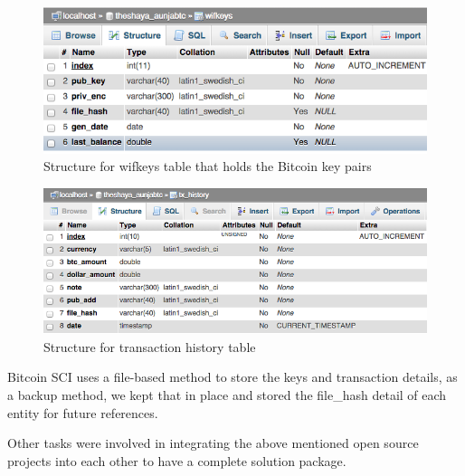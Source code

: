 \begin{figure}[htb!p]
\centering
\includegraphics[scale=0.5]{fig/wifkeys_table.png}
  \caption{Structure for wifkeys table that holds the Bitcoin key pairs}
\label{fig:wifkeys}
\end{figure}

\begin{figure}[htb!p]
\centering
\includegraphics[scale=0.5]{fig/tx_history_table.png}
  \caption{Structure for transaction history table}
\label{fig:txhistory}
\end{figure}

Bitcoin SCI uses a file-based method to store the keys and transaction details, as a backup method, we kept that in place and stored the file\_hash detail of each entity for future references.

Other tasks were involved in integrating the above mentioned open source projects into each other to have a complete solution package.

